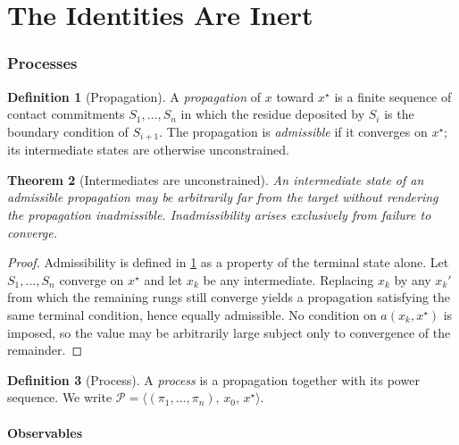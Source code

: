 \documentclass[11pt,twocolumn,a4paper]{article}
\theoremstyle{plain}
\newtheorem{theorem}{Theorem}[section]
\theoremstyle{definition}
\newtheorem{definition}[theorem]{Definition}
\theoremstyle{remark}
\newcommand{\pow}{\pi}
\newcommand{\Prop}{\mathcal{P}}
\newcommand{\target}{x^{\star}}
\begin{document}
\part{The Identities Are Inert}
\label{part:inertness}

\section{Processes}
\label{sec:processes}

\begin{definition}[Propagation]
\label{def:propagation}
A \emph{propagation} of $x$ toward $\target$ is a finite sequence of contact
commitments $S_1,\dots,S_n$ in which the residue deposited by $S_i$ is the
boundary condition of $S_{i+1}$. The propagation is \emph{admissible} if it
converges on $\target$; its intermediate states are otherwise unconstrained.
\end{definition}

\begin{theorem}[Intermediates are unconstrained]
\label{thm:localfree}
An intermediate state of an admissible propagation may be arbitrarily far from
the target without rendering the propagation inadmissible. Inadmissibility
arises exclusively from failure to converge.
\end{theorem}

\begin{proof}
Admissibility is defined in \cref{def:propagation} as a property of the terminal
state alone. Let $S_1,\dots,S_n$ converge on $\target$ and let $x_k$ be any
intermediate. Replacing $x_k$ by any $x_k'$ from which the remaining rungs still
converge yields a propagation satisfying the same terminal condition, hence
equally admissible. No condition on $a(x_k,\target)$ is imposed, so the value
may be arbitrarily large subject only to convergence of the remainder.
\end{proof}

\begin{definition}[Process]
\label{def:process}
A \emph{process} is a propagation together with its power sequence. We write
$\Prop = \langle (\pow_1,\dots,\pow_n),\, x_0,\, \target \rangle$.
\end{definition}

\subsection{Observables}
\end{document}
